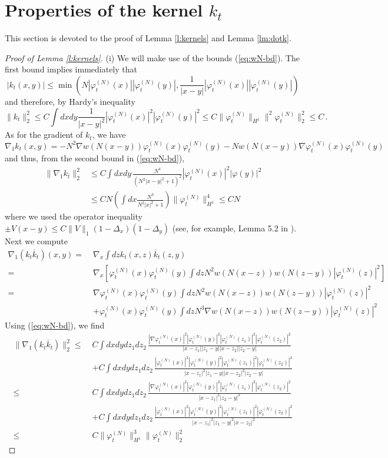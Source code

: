 \documentclass[11pt,a4paper]{article}
\newcommand{\ph}{\varphi_t^{(N)}}	%
\begin{document}
\section{Properties of the kernel $k_t$}
\label{sec:kernels}


This section is devoted to the proof of Lemma \ref{l:kernels} and Lemma \ref{lm:dotk}.

\begin{proof}[Proof of Lemma \ref{l:kernels}]
(i) We will make use of the bounds (\ref{eq:wN-bd}). The first bound implies immediately that
\begin{equation}\label{eq:k-pt} |k_t (x,y)| \leq \min \left(N |\ph (x)| |\ph (y)| , \frac{1}{|x-y|} |\ph (x)| |\ph (y)| \right) \end{equation}
and therefore, by Hardy's inequality 
\[ \| k_t \|_2^2 \leq C \int dx dy \frac{1}{|x-y|^2} |\ph (x)|^2 |\ph (y)|^2 \leq C \| \ph \|_{H^1} \|^2 \ph \|_2^2  \leq C \, . \]
As for the gradient of $k_t$, we have
\[ \nabla_1 k_t (x,y) = -N^2 \nabla w (N (x-y)) \ph (x) \ph (y) - N w (N (x-y)) \nabla \ph (x) \ph (y) \]
and thus, from the second bound in (\ref{eq:wN-bd}), 
\[ \begin{split} \| \nabla_1 k_t \|_2^2 & \leq C \int dx dy \, \frac{N^4}{(N^2 |x-y|^2 + 1)^2}  |\ph (x)|^2 |\varphi (y)|^2  \\ & \leq C N \left(\int dx \frac{N^3}{N^2 |x|^2 + 1} \right) \| \ph \|_{H^1}^4 \leq C N \end{split} \]
where we used the operator inequality $\pm V(x-y) \leq C \| V \|_1 (1-\Delta_x) (1-\Delta_y)$ (see, for example, Lemma 5.2 in \cite{ESY0}). Next we compute
\[ \begin{split} 
\nabla_1(k_t \overline{k}_t) (x,y) =\; & \nabla_x \int dz k_t (x,z) \overline{k}_t (z,y) \\ 
= \; &\nabla_x \left[  \ph (x) \ph (y) \int dz N^2 w (N(x-z)) w(N(z-y)) |\ph (z)|^2 \right] \\
= \; &\nabla \ph (x) \ph (y) \int dz N^2 w (N(x-z)) w(N(z-y)) |\ph (z)|^2\\ &+ \ph (x) \ph (y) \int dz N^3 \nabla w (N (x-z)) w(N(z-y)) |\ph (z)|^2 \end{split} \] 
Using (\ref{eq:wN-bd}), we find
\[ \begin{split}  \| \nabla_1 (k_t \overline{k}_t) \|_2^2 \leq \; &C \int dx dy dz_1 dz_2 \, \frac{|\nabla \ph (x)|^2 |\ph (y)|^2 |\ph(z_1)|^2 |\ph (z_2)|^2}{|x-z_1||z_1 -y||x-z_2||z_2 -y|} \\
&+C \int dx dy dz_1 dz_2 \, \frac{|\ph (x)|^2 |\ph (y)|^2 |\ph(z_1)|^2 |\ph (z_2)|^2}{|x-z_1|^2 |z_1 -y| |x-z_2|^2 |z_2 -y|} \\  \leq \; &C \int dx dy dz_1 dz_2 \, \frac{|\nabla \ph (x)|^2 |\ph (y)|^2 |\ph(z_1)|^2 |\ph (z_2)|^2}{|x-z_1|^2 |z_2 -y|^2} \\
&+C \int dx dy dz_1 dz_2 \, \frac{|\ph (x)|^2 |\ph (y)|^2 |\ph(z_1)|^2 |\ph (z_2)|^2}{|x-z_1|^2 |z_1 - y|^2 |x-z_2|^2} \\ \leq \; &C \| \ph \|_{H^1}^3 \| \ph \|^2_2 \end{split}\]


\end{proof}
\end{document}
